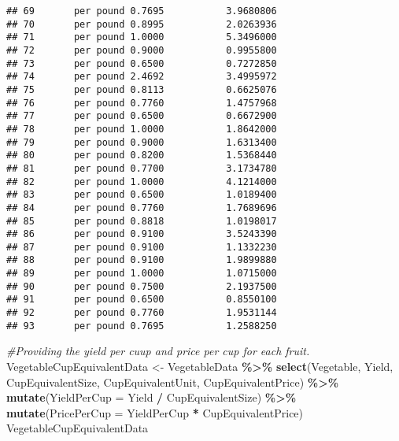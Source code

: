 \documentclass[
]{article}
\newenvironment{Shaded}{\begin{snugshade}}{\end{snugshade}}
\newcommand{\AttributeTok}[1]{\textcolor[rgb]{0.13,0.29,0.53}{#1}}
\newcommand{\CommentTok}[1]{\textcolor[rgb]{0.56,0.35,0.01}{\textit{#1}}}
\newcommand{\FunctionTok}[1]{\textcolor[rgb]{0.13,0.29,0.53}{\textbf{#1}}}
\newcommand{\NormalTok}[1]{#1}
\newcommand{\OtherTok}[1]{\textcolor[rgb]{0.56,0.35,0.01}{#1}}
\newcommand{\SpecialCharTok}[1]{\textcolor[rgb]{0.81,0.36,0.00}{\textbf{#1}}}
\begin{document}
\begin{verbatim}
## 69       per pound 0.7695           3.9680806
## 70       per pound 0.8995           2.0263936
## 71       per pound 1.0000           5.3496000
## 72       per pound 0.9000           0.9955800
## 73       per pound 0.6500           0.7272850
## 74       per pound 2.4692           3.4995972
## 75       per pound 0.8113           0.6625076
## 76       per pound 0.7760           1.4757968
## 77       per pound 0.6500           0.6672900
## 78       per pound 1.0000           1.8642000
## 79       per pound 0.9000           1.6313400
## 80       per pound 0.8200           1.5368440
## 81       per pound 0.7700           3.1734780
## 82       per pound 1.0000           4.1214000
## 83       per pound 0.6500           1.0189400
## 84       per pound 0.7760           1.7689696
## 85       per pound 0.8818           1.0198017
## 86       per pound 0.9100           3.5243390
## 87       per pound 0.9100           1.1332230
## 88       per pound 0.9100           1.9899880
## 89       per pound 1.0000           1.0715000
## 90       per pound 0.7500           2.1937500
## 91       per pound 0.6500           0.8550100
## 92       per pound 0.7760           1.9531144
## 93       per pound 0.7695           1.2588250
\end{verbatim}

\begin{Shaded}
\begin{Highlighting}[]
\CommentTok{\#Providing the yield per cuup and price per cup for each fruit. }
\NormalTok{VegetableCupEquivalentData }\OtherTok{\textless{}{-}}\NormalTok{ VegetableData }\SpecialCharTok{\%\textgreater{}\%} \FunctionTok{select}\NormalTok{(Vegetable, Yield, CupEquivalentSize, CupEquivalentUnit, CupEquivalentPrice) }\SpecialCharTok{\%\textgreater{}\%} \FunctionTok{mutate}\NormalTok{(}\AttributeTok{YieldPerCup =}\NormalTok{ Yield }\SpecialCharTok{/}\NormalTok{ CupEquivalentSize) }\SpecialCharTok{\%\textgreater{}\%} \FunctionTok{mutate}\NormalTok{(}\AttributeTok{PricePerCup =}\NormalTok{ YieldPerCup }\SpecialCharTok{*}\NormalTok{ CupEquivalentPrice)}
\NormalTok{VegetableCupEquivalentData}
\end{Highlighting}
\end{Shaded}
\end{document}

